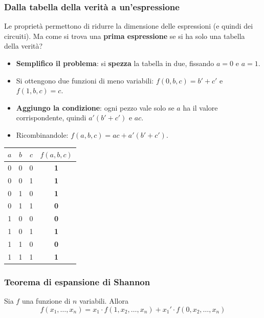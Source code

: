 \documentclass[12pt, a4paper]{article}
\begin{document}
\subsubsection{Dalla tabella della verità a un'espressione}
Le proprietà permettono di ridurre la dimensione delle espressioni (e quindi dei circuiti). Ma come si trova una \textbf{prima espressione} se si ha solo una tabella della verità?

\begin{itemize}
    \item \textbf{Semplifico il problema}: si \textbf{spezza} la tabella in due, fissando $a = 0$ e $a = 1$.
    \item Si ottengono due funzioni di meno variabili: $f(0,b,c) = b' + c'$ e $f(1,b,c) = c$.
    \item \textbf{Aggiungo la condizione}: ogni pezzo vale solo se $a$ ha il valore corrispondente, quindi $a'(b'+c')$ e $ac$.
    \item Ricombinandole: $f(a,b,c) = ac + a'(b'+c')$.
\end{itemize}

\begin{center}
\renewcommand{\arraystretch}{1.25}
\begin{tabular}[t]{|ccc||c|}
\hline
\colorbox{gray!25}{\color{black}$a$} & \colorbox{gray!25}{\color{black}$b$} & \colorbox{gray!25}{\color{black}$c$} & \colorbox{gray!25}{\color{black}$f(a,b,c)$} \\ \hline
0 & 0 & 0 & \textbf{1} \\ \hline
0 & 0 & 1 & \textbf{1} \\ \hline
0 & 1 & 0 & \textbf{1} \\ \hline
0 & 1 & 1 & \textbf{0} \\ \hline
1 & 0 & 0 & \textbf{0} \\ \hline
1 & 0 & 1 & \textbf{1} \\ \hline
1 & 1 & 0 & \textbf{0} \\ \hline
1 & 1 & 1 & \textbf{1} \\ \hline
\end{tabular}
\end{center}

\subsubsection{Teorema di espansione di Shannon}

\begin{tcolorbox}[colback=blue!5!white, colframe=blue!60!black, title=\textbf{Teorema di espansione di Shannon}]
Sia $f$ una funzione di $n$ variabili. Allora
$$f(x_1, \dots, x_n) = x_1 \cdot f(1, x_2, \dots, x_n) + x_1' \cdot f(0, x_2, \dots, x_n)$$
\end{tcolorbox}
\end{document}
